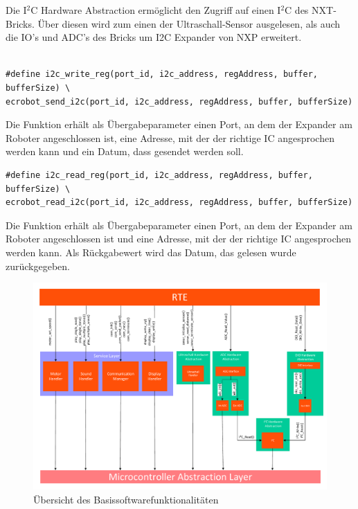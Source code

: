 Die I$^2$C Hardware Abstraction ermöglicht den Zugriff auf einen I$^2$C des NXT-Bricks. Über diesen wird zum einen der Ultraschall-Sensor ausgelesen, als auch die IO's und ADC's des Bricks um I2C Expander von NXP erweitert.
\begin{lstlisting}[frame=single,caption={Aufruf der I$^2$C \textit{Write}-Funktion},captionpos=b]

#define i2c_write_reg(port_id, i2c_address, regAddress, buffer, bufferSize) \ 
ecrobot_send_i2c(port_id, i2c_address, regAddress, buffer, bufferSize)
\end{lstlisting}
Die Funktion erhält als Übergabeparameter einen Port, an dem der Expander am Roboter angeschlossen ist, eine Adresse, mit der der richtige IC angesprochen werden kann und ein Datum, dass gesendet werden soll.\\
\begin{lstlisting}[frame=single,caption={Aufruf der I$^2$C \textit{Read}-Funktion},captionpos=b]  
#define i2c_read_reg(port_id, i2c_address, regAddress, buffer, bufferSize) \
ecrobot_read_i2c(port_id, i2c_address, regAddress, buffer, bufferSize)
\end{lstlisting}
Die Funktion erhält als Übergabeparameter einen Port, an dem der Expander am Roboter angeschlossen ist und eine Adresse, mit der der richtige IC angesprochen werden kann. Als Rückgabewert wird das Datum, das gelesen wurde zurückgegeben.
\clearpage
\newpage

\begin{landscape}
\begin{figure}[h]
\includegraphics[page=1,scale=0.7]{Dokumente/Schichtenmodel.pdf}
\caption{Übersicht des Basissoftwarefunktionalitäten}
\label{pic:Basissoftware}
\end{figure}
\end{landscape}
\newpage

